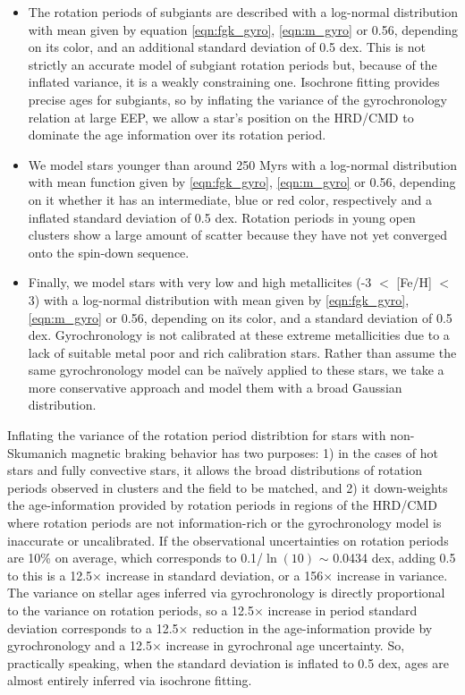 {\begin{itemize}
    \item{The rotation periods of subgiants are described with a log-normal
        distribution with mean given by equation \ref{eqn:fgk_gyro},
        \ref{eqn:m_gyro} or 0.56, depending on its color, and an additional
        standard deviation of 0.5 dex.
        This is not strictly an accurate model of subgiant rotation periods
        \citep[see, \eg][]{vansaders2013} but, because of the inflated
        variance, it is a weakly constraining one.
        Isochrone fitting provides precise ages for subgiants, so by inflating
        the variance of the gyrochronology relation at large EEP, we allow a
        star's position on the HRD/CMD to dominate the age information over
        its rotation period.}
    \item{We model stars younger than around 250 Myrs with a log-normal
        distribution with mean function given by \ref{eqn:fgk_gyro},
        \ref{eqn:m_gyro} or 0.56, depending on it whether it has
        an intermediate, blue or red color, respectively and a inflated
        standard deviation of 0.5 dex.
        Rotation periods in young open clusters show a large amount of scatter
        because they have not yet converged onto the \citet{skumanich1972}
        spin-down sequence.}
    \item{Finally, we model stars with very low and high metallicites (-3 $<$
        [Fe/H] $<$ 3) with a log-normal distribution with mean given by
        \ref{eqn:fgk_gyro}, \ref{eqn:m_gyro} or 0.56, depending on its color,
        and a standard deviation of 0.5 dex.
        Gyrochronology is not calibrated at these extreme metallicities due to
        a lack of suitable metal poor and rich calibration stars.
        Rather than assume the same gyrochronology model can be na\"ively
        applied to these stars, we take a more conservative approach and model
        them with a broad Gaussian distribution.}
\end{itemize}
Inflating the variance of the rotation period distribtion for stars with
non-Skumanich magnetic braking behavior has two purposes: 1) in the cases of
hot stars and fully convective stars, it allows the broad distributions of
rotation periods observed in clusters and the field to be matched, and 2) it
down-weights the age-information provided by rotation periods in regions of
the HRD/CMD where rotation periods are not information-rich or the
gyrochronology model is inaccurate or uncalibrated.
If the observational uncertainties on rotation periods are 10\% on average,
which corresponds to 0.1/$\ln(10)$ $\sim$ 0.0434 dex, adding 0.5 to this is
a 12.5$\times$ increase in standard deviation, or a 156$\times$ increase in
variance.
The variance on stellar ages inferred via gyrochronology is directly
proportional to the variance on rotation periods, so a 12.5$\times$ increase
in period standard deviation corresponds to a 12.5$\times$ reduction in the
age-information provide by gyrochronology and a 12.5$\times$ increase in
gyrochronal age uncertainty.
So, practically speaking, when the standard deviation is inflated to 0.5 dex,
ages are almost entirely inferred via isochrone fitting.
}

